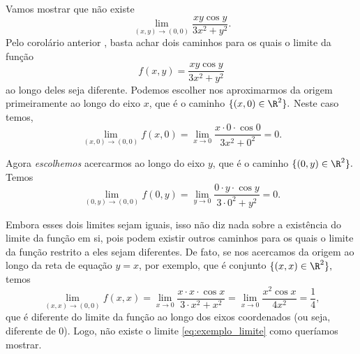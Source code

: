 \begin{example}{}{}
Vamos mostrar que não existe 
\begin{equation}\label{eq:exemplo_limite}
\lim_{(x,y)\rightarrow(0,0)} \dfrac{xy\cos y}{3x^2+y^2}.
\end{equation} 
Pelo corolário anterior%
, basta achar dois caminhos para os quais o limite da função 
$$f(x,y)=\dfrac{xy\cos y}{3x^2+y^2}$$ 
ao longo deles seja diferente. Podemos escolher nos aproximarmos da origem primeiramente ao longo do eixo $x$, que é o caminho
$\{(x,0)\in\R^2\}.$ 
Neste caso temos, 
$$ \lim_{(x,0)\rightarrow(0,0)} f(x,0)=\lim_{x\rightarrow 0} \dfrac{x\cdot 0 \cdot \cos 0}{3x^2+0^2}=0. $$

Agora \textit{escolhemos} acercarmos ao longo do eixo $y$, que é o caminho 
$\{(0,y)\in\R^2\}.$ 
Temos
$$ \lim_{(0,y)\rightarrow(0,0)} f(0,y)=\lim_{y\rightarrow 0} \dfrac{0\cdot y \cdot \cos y}{3\cdot 0^2+y^2}=0. $$

Embora esses dois limites sejam iguais, isso não diz nada sobre a existência do limite da função em si, pois podem existir outros caminhos para os quais o limite da função restrito a eles sejam diferentes. De fato, se nos acercamos da origem ao longo da reta de equação $y=x$, por exemplo, que é  conjunto
$\{(x,x)\in\R^2\},$ 
temos
$$\lim_{(x,x)\rightarrow(0,0)} f(x,x)=\lim_{x\rightarrow 0} \dfrac{x\cdot x \cdot \cos x}{3\cdot x^2+x^2}=\lim_{x\rightarrow 0} \dfrac{x^2 \cos x}{4x^2}= \frac{1}{4},$$
que é diferente do limite da função ao longo dos eixos coordenados (ou seja, diferente de 0). Logo, não existe o limite \eqref{eq:exemplo_limite} como queríamos mostrar. 
\end{example}



